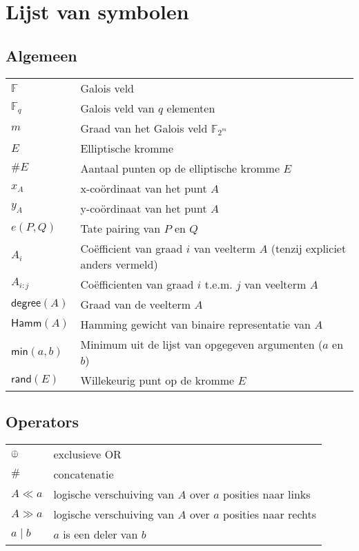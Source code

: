 \chapter*{Lijst van symbolen}

\section*{Algemeen}

\begin{tabular}{l@{$\qquad$}l}
$\mathbb{F}$	& Galois veld\\
$\mathbb{F}_q$	& Galois veld van $q$ elementen\\
$m$				& Graad van het Galois veld $\mathbb{F}_{2^m}$\\
$E$				& Elliptische kromme\\
$\#E$				& Aantaal punten op de elliptische kromme $E$\\
$x_A$				& x-co\"ordinaat van het punt $A$\\
$y_A$				& y-co\"ordinaat van het punt $A$\\
$e(P, Q)$		& Tate pairing van $P$ en $Q$\\
$A_i$				& Co\"efficient van graad $i$ van veelterm $A$ (tenzij expliciet anders vermeld)\\
$A_{i:j}$				& Co\"efficienten van graad $i$ t.e.m. $j$ van veelterm $A$\\
$\textsf{degree}(A)$	& Graad van de veelterm $A$\\
$\textsf{Hamm}(A)$	& Hamming gewicht van binaire representatie van $A$\\
$\textsf{min}(a, b)$	& Minimum  uit de lijst van opgegeven argumenten ($a$ en $b$)\\
$\textsf{rand}(E)$	& Willekeurig punt op de kromme $E$\\
\end{tabular}

\section*{Operators}

\begin{tabular}{l@{$\qquad$}l}
$\oplus$	& exclusieve OR\\
$\#$		& concatenatie\\
$A \ll a$	& logische verschuiving van $A$ over $a$ posities naar links\\
$A \gg a$	& logische verschuiving van $A$ over $a$ posities naar rechts\\
$a \mid b$	& $a$ is een deler van $b$\\
\end{tabular}
